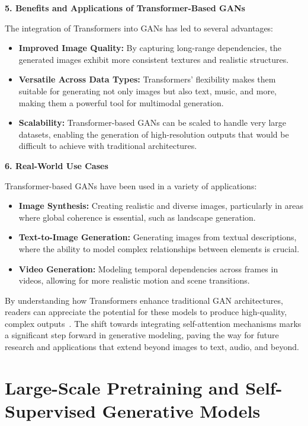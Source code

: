 \textbf{5. Benefits and Applications of Transformer-Based GANs}

The integration of Transformers into GANs has led to several advantages:
\begin{itemize}
    \item \textbf{Improved Image Quality:} By capturing long-range dependencies, the generated images exhibit more consistent textures and realistic structures.
    \item \textbf{Versatile Across Data Types:} Transformers' flexibility makes them suitable for generating not only images but also text, music, and more, making them a powerful tool for multimodal generation.
    \item \textbf{Scalability:} Transformer-based GANs can be scaled to handle very large datasets, enabling the generation of high-resolution outputs that would be difficult to achieve with traditional architectures.
\end{itemize}

\textbf{6. Real-World Use Cases}

Transformer-based GANs have been used in a variety of applications:
\begin{itemize}
    \item \textbf{Image Synthesis:} Creating realistic and diverse images, particularly in areas where global coherence is essential, such as landscape generation.
    \item \textbf{Text-to-Image Generation:} Generating images from textual descriptions, where the ability to model complex relationships between elements is crucial.
    \item \textbf{Video Generation:} Modeling temporal dependencies across frames in videos, allowing for more realistic motion and scene transitions.
\end{itemize}

By understanding how Transformers enhance traditional GAN architectures, readers can appreciate the potential for these models to produce high-quality, complex outputs~\cite{li2024survey}. The shift towards integrating self-attention mechanisms marks a significant step forward in generative modeling, paving the way for future research and applications that extend beyond images to text, audio, and beyond.


\section{Large-Scale Pretraining and Self-Supervised Generative Models}

